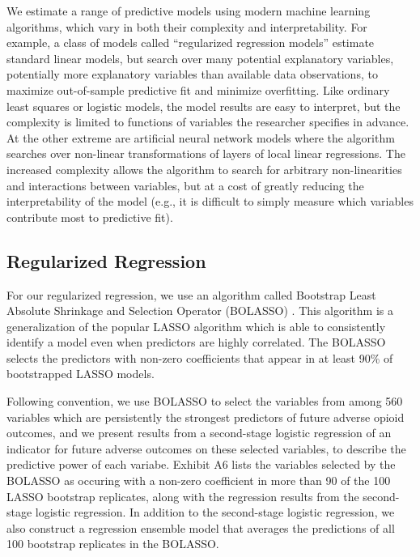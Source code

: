 \documentclass[9pt,twoside]{pnas-new}
\begin{document}
We estimate a range of predictive models using modern machine learning algorithms, which vary in both their complexity and interpretability. For example, a class of models called ``regularized regression models'' estimate standard linear models, but search over many potential explanatory variables, potentially more explanatory variables than available data observations, to maximize out-of-sample predictive fit and minimize overfitting. Like ordinary least squares or logistic models, the model results are easy to interpret, but the complexity is limited to functions of variables the researcher specifies in advance. At the other extreme are artificial neural network models where the algorithm searches over non-linear transformations of layers of local linear regressions. The increased complexity allows the algorithm to search for arbitrary non-linearities and interactions between variables, but at a cost of greatly reducing the interpretability of the model (e.g., it is difficult to simply measure which variables contribute most to predictive fit).

\subsection{Regularized Regression}

For our regularized regression, we use an algorithm called Bootstrap Least Absolute Shrinkage and Selection Operator (BOLASSO) \cite{bach}. This algorithm is a generalization of the popular LASSO algorithm which is able to consistently identify a model even when predictors are highly correlated. The BOLASSO selects the predictors with non-zero coefficients that appear in at least 90\% of bootstrapped LASSO models. 

Following convention, we use BOLASSO to select the variables from among 560 variables which are persistently the strongest predictors of future adverse opioid outcomes, and we present results from a second-stage logistic regression of an indicator for future adverse outcomes on these selected variables, to describe the predictive power of each variabe. Exhibit A6 lists the variables selected by the BOLASSO as occuring with a non-zero coefficient in more than 90 of the 100 LASSO bootstrap replicates, along with the regression results from the second-stage logistic regression. In addition to the second-stage logistic regression, we also construct a regression ensemble model that averages the predictions of all 100 bootstrap replicates in the BOLASSO.
\end{document}
